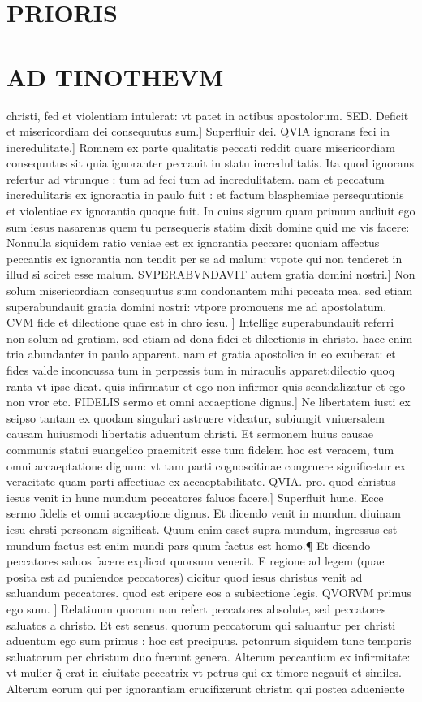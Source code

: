 \documentclass{article}
\begin{document}
\begin{pages}
\section*{PRIORIS }
\section*{AD TINOTHEVM }\pstart christi, fed et violentiam intulerat: vt patet in actibus apostolorum. SED. Deficit et misericordiam dei consequutus sum.] Superfluir dei. QVIA ignorans feci in incredulitate.] Romnem ex parte qualitatis peccati reddit quare misericordiam consequutus sit quia ignoranter peccauit in statu incredulitatis. Ita quod ignorans refertur ad vtrunque : tum ad feci tum ad incredulitatem. nam et peccatum incredulitaris ex ignorantia in paulo fuit : et factum blasphemiae persequutionis et violentiae ex ignorantia quoque fuit. In cuius signum quam primum audiuit ego sum iesus nasarenus quem tu persequeris statim dixit domine quid me vis facere: Nonnulla siquidem ratio veniae est ex ignorantia peccare: quoniam affectus peccantis ex ignorantia  non tendit per se ad malum: vtpote qui non tenderet in illud si sciret esse malum. SVPERABVNDAVIT autem gratia domini nostri.] Non solum misericordiam consequutus sum condonantem mihi peccata mea, sed etiam superabundauit gratia domini nostri: vtpore promouens me ad apostolatum. CVM fide et dilectione quae est in chro iesu. ] Intellige superabundauit referri non solum ad gratiam, sed etiam ad dona fidei et dilectionis in christo. haec enim tria abundanter in paulo apparent. nam et gratia apostolica in eo exuberat: et fides valde inconcussa tum in perpessis tum in miraculis apparet:dilectio quoq ranta vt ipse dicat. quis infirmatur et ego non infirmor quis scandalizatur et ego non vror etc.   \pend\pstart FIDELIS sermo et omni accaeptione dignus.] Ne libertatem iusti ex seipso tantam ex quodam singulari astruere videatur, subiungit vniuersalem causam huiusmodi libertatis aduentum christi. Et sermonem huius causae communis statui euangelico praemitrit esse tum fidelem hoc est veracem, tum omni accaeptatione dignum: vt tam parti cognoscitinae congruere significetur ex veracitate quam parti affectiuae ex accaeptabilitate. QVIA. pro. quod christus iesus venit in hunc mundum peccatores faluos facere.] Superfluit hunc. Ecce sermo fidelis et omni accaeptione dignus. Et dicendo venit in mundum diuinam iesu chrsti personam significat. Quum enim esset supra mundum, ingressus est mundum factus est enim mundi pars quum factus est homo.¶ Et dicendo peccatores saluos facere explicat quorsum venerit. E regione ad legem (quae posita est ad puniendos peccatores) dicitur quod iesus christus venit ad saluandum peccatores. quod est eripere eos a subiectione legis. QVORVM primus ego sum. ] Relatiuum quorum non refert peccatores absolute, sed peccatores saluatos a christo. Et est sensus. quorum peccatorum qui saluantur per christi aduentum ego sum primus : hoc est precipuus. pctonrum siquidem tunc temporis saluatorum per christum duo fuerunt genera. Alterum peccantium ex infirmitate: vt mulier q̃ erat in ciuitate peccatrix vt petrus qui ex timore negauit et similes. Alterum eorum qui per ignorantiam crucifixerunt christm qui postea adueniente 
\end{pages}
\end{document}
